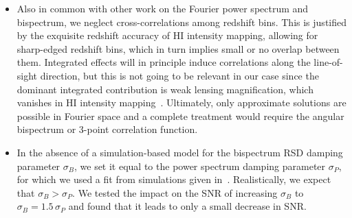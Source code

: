 \begin{itemize}
\item 
Also in common with other work on the Fourier power spectrum and bispectrum, we neglect cross-correlations among redshift bins.  This is justified by the exquisite redshift accuracy of HI intensity mapping, allowing for sharp-edged redshift bins, which in turn implies small or no overlap between them. Integrated effects will in principle induce correlations along the line-of-sight direction, but this is not going to be relevant in our case since the dominant integrated contribution is weak lensing magnification, which vanishes in HI intensity mapping~\cite{Hall:2012wd,Alonso:2015uua,DiDio:2015bua,Jalivand:2018vfz}.    
Ultimately, only approximate solutions are possible in Fourier space and a complete treatment would require the angular bispectrum or 3-point correlation function.
\item 
In the absence of a simulation-based model for the bispectrum RSD damping parameter $\sigma_B$, we set it equal to the power spectrum damping parameter $\sigma_P$, for which we used a fit from simulations given in~\cite{Sarkar:2019nak}. Realistically, we expect that $\sigma_B >\sigma_P$. We tested the impact  on the SNR of increasing $\sigma_B$ to $\sigma_B=1.5\, \sigma_P$ and found that it leads to only a small decrease in SNR. 

\end{itemize}



